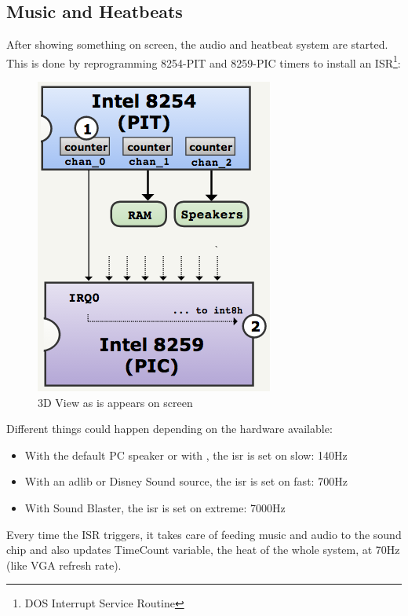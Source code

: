 \documentclass[book.tex]{subfiles}
\begin{document}
\subsection{Music and Heatbeats}
After showing something on screen, the audio and heatbeat system are started. This is done by reprogramming 8254-PIT and 8259-PIC timers to install an ISR\footnote{DOS Interrupt Service Routine}:\\
\begin{figure}[H]
\centering
 \includegraphics[width=\textwidth]{imgs/heatbeats.png}
 \caption{3D View as is appears on screen} 
 \end{figure}

Different things could happen depending on the hardware available:
\begin{itemize}
\item With the default PC speaker or with , the isr is set on slow: 140Hz
\item With an adlib or Disney Sound source, the isr is set on fast: 700Hz
\item With Sound Blaster, the isr is set on extreme: 7000Hz
\end{itemize}
Every time the ISR triggers, it takes care of feeding music and audio to the sound chip and also updates TimeCount variable, the heat of the whole system, at 70Hz (like VGA refresh rate).
\end{document}
